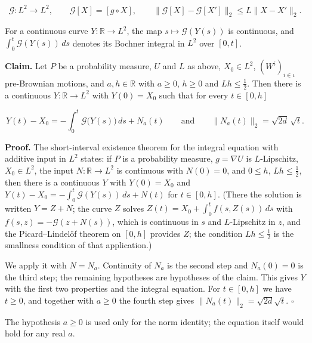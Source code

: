 \documentclass[11pt,a4paper]{article}
\begin{document}
\[\mathcal G:L^2\to L^2,\qquad \mathcal G[X]=[g\circ X],\qquad \|\mathcal G[X]-\mathcal G[X']\|_2\le L\|X-X'\|_2 .\]


For a continuous curve \(Y:\mathbb R\to L^2\), the map \(s\mapsto\mathcal G(Y(s))\) is continuous, and \(\int_0^t\mathcal G(Y(s))\,ds\) denotes its Bochner integral in \(L^2\) over \([0,t]\).




\textbf{Claim.} Let \(P\) be a probability measure, \(U\) and \(L\) as above, \(X_0\in L^2\), \((W^i)_{i\in\iota}\) pre-Brownian motions, and \(a,h\in\mathbb R\) with \(a\ge0\), \(h\ge0\) and \(Lh\le\tfrac12\). Then there is a continuous \(Y:\mathbb R\to L^2\) with \(Y(0)=X_0\) such that for every \(t\in[0,h]\)


\[Y(t)-X_0=-\int_0^t\mathcal G\bigl(Y(s)\bigr)\,ds+N_a(t)\qquad\text{and}\qquad\|N_a(t)\|_2=\sqrt{2d}\,\sqrt t.\]


\textbf{Proof.} The short-interval existence theorem for the integral equation with additive input in \(L^2\) \cite[Section~3.14.4]{LangevinLean2026ULASC} states: if \(P\) is a probability measure, \(g=\nabla U\) is \(L\)-Lipschitz, \(X_0\in L^2\), the input \(N:\mathbb R\to L^2\) is continuous with \(N(0)=0\), and \(0\le h\), \(Lh\le\frac12\), then there is a continuous \(Y\) with \(Y(0)=X_0\) and \(Y(t)-X_0=-\int_0^t\mathcal G(Y(s))\,ds+N(t)\) for \(t\in[0,h]\). (There the solution is written \(Y=Z+N\); the curve \(Z\) solves \(Z(t)=X_0+\int_0^tf(s,Z(s))\,ds\) with \(f(s,z)=-\mathcal G(z+N(s))\), which is continuous in \(s\) and \(L\)-Lipschitz in \(z\), and the Picard–Lindelöf theorem on \([0,h]\) provides \(Z\); the condition \(Lh\le\frac12\) is the smallness condition of that application.)




We apply it with \(N=N_a\). Continuity of \(N_a\) is the second step and \(N_a(0)=0\) is the third step; the remaining hypotheses are hypotheses of the claim. This gives \(Y\) with the first two properties and the integral equation. For \(t\in[0,h]\) we have \(t\ge0\), and together with \(a\ge0\) the fourth step gives \(\|N_a(t)\|_2=\sqrt{2d}\sqrt t\). \(\square\)




The hypothesis \(a\ge0\) is used only for the norm identity; the equation itself would hold for any real \(a\).
\end{document}
